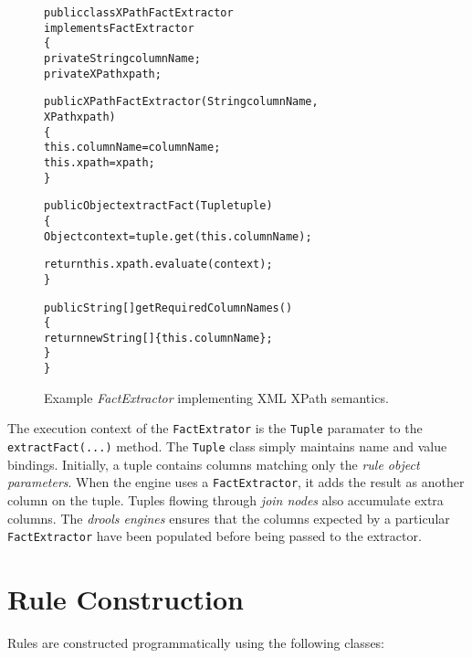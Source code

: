\documentclass[10pt,twocolumn,letterpaper]{article}
\newenvironment{codelisting}%
	{\begin{minipage}{250pt}\small\begin{alltt}}%
	{\end{alltt}\end{minipage}}
\begin{document}
\begin{figure*}[p]
	\begin{codelisting}
	public class XPathFactExtractor 
	             implements FactExtractor
	\{
	     private String columnName;
	     private XPath  xpath;

	     public XPathFactExtractor(String columnName,
	                               XPath xpath)
	     \{
	          this.columnName = columnName;
	          this.xpath      = xpath;
	     \}

	     public Object extractFact(Tuple tuple)
	     \{
	          Object context = tuple.get( this.columnName );

	          return this.xpath.evaluate( context );
	     \}

	     public String[] getRequiredColumnNames()
	     \{
	          return new String[] \{ this.columnName \};
	     \}
	\}
	\end{codelisting}
	\caption{Example \emph{FactExtractor} implementing XML XPath semantics.}
	\label{semantic.fact-extractor.xml-example}
\end{figure*}

The execution context of the \verb|FactExtrator| is the \verb|Tuple|
paramater to the \verb|extractFact(...)| method.  The \verb|Tuple|
class simply maintains name and value bindings.  Initially, a tuple
contains columns matching only the \emph{rule object parameters}.
When the engine uses a \verb|FactExtractor|, it adds the result as
another column on the tuple.  Tuples flowing through \emph{join nodes}
also accumulate extra columns. The \emph{drools engines} ensures that
the columns expected by a particular \verb|FactExtractor| have been
populated before being passed to the extractor. 

\section{Rule Construction}

Rules are constructed programmatically using the following classes:
\end{document}
